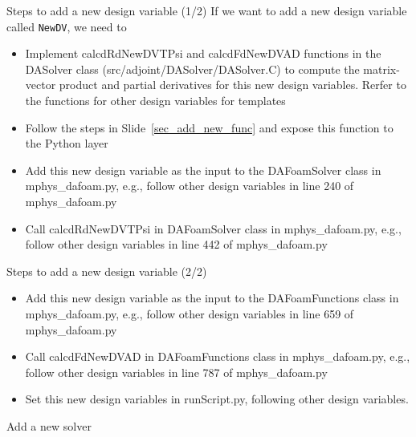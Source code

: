 \documentclass{bredelebeamer}
\begin{document}
\begin{frame}[fragile]{Steps to add a new design variable (1/2)}
If we want to add a new design variable called \texttt{NewDV}, we need to
\begin{itemize}
  \setlength\itemsep{0.5em}
 \item Implement calcdRdNewDVTPsi and calcdFdNewDVAD functions in the DASolver class (src/adjoint/DASolver/DASolver.C) to compute the matrix-vector product and partial derivatives for this new design variables. Rerfer to the functions for other design variables for templates
 \item Follow the steps in Slide~\ref{sec_add_new_func} and expose this function to the Python layer
 \item Add this new design variable as the input to the DAFoamSolver class in mphys\_dafoam.py, e.g., follow other design variables in line 240 of mphys\_dafoam.py
 \item Call calcdRdNewDVTPsi in DAFoamSolver class in mphys\_dafoam.py, e.g., follow other design variables in line 442 of mphys\_dafoam.py
\end{itemize}
\end{frame}

\begin{frame}[fragile]{Steps to add a new design variable (2/2)}
\begin{itemize}
    \setlength\itemsep{0.5em}
   \item Add this new design variable as the input to the DAFoamFunctions class in mphys\_dafoam.py, e.g., follow other design variables in line 659 of mphys\_dafoam.py
   \item Call calcdFdNewDVAD in DAFoamFunctions class in mphys\_dafoam.py, e.g., follow other design variables in line 787 of mphys\_dafoam.py
   \item Set this new design variables in runScript.py, following other design variables. 
\end{itemize}
\end{frame}


\begin{frame}{}
  \center \Large Add a new solver
\end{frame}
\end{document}

